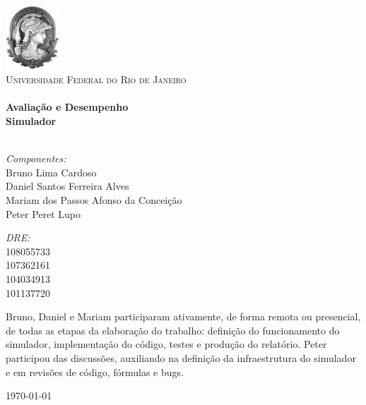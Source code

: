 \begin{titlepage}

\begin{center}

\includegraphics[width=0.15\textwidth]{./logo.jpeg}\\[1cm]

\textsc{\LARGE Universidade Federal do Rio de Janeiro}\\[1.5cm]


\HRule \\[0.4cm]
{ \huge \bfseries Avaliação e Desempenho }\\[0.4cm]
{ \huge \bfseries Simulador} \\[0.4cm]
\HRule \\[1.5cm]


\begin{minipage}{0.6\textwidth}
  \begin{flushleft} 
  \emph{Componentes:}\\
  Bruno Lima Cardoso \\
  Daniel Santos Ferreira Alves \\
  Mariam dos Passos Afonso da Conceição \\
  Peter Peret Lupo
  \end{flushleft}
\end{minipage}
\begin{minipage}{0.3\textwidth}
  \begin{flushright}
  \emph{DRE:} \\
  108055733 \\
  107362161 \\
  104034913 \\
  101137720
  \end{flushright}
\end{minipage}

\vfill

\begin{minipage}{1.0\textwidth}
  \small Bruno, Daniel e Mariam participaram ativamente, de forma remota ou presencial, de todas as etapas da elaboração do trabalho: definição do funcionamento do simulador, implementação do código, testes e produção do relatório. Peter participou das discussões, auxiliando na definição da infraestrutura do simulador e em revisões de código, fórmulas e bugs.\\
\end{minipage}

\vfill


{\large \today}

\end{center}

\end{titlepage}